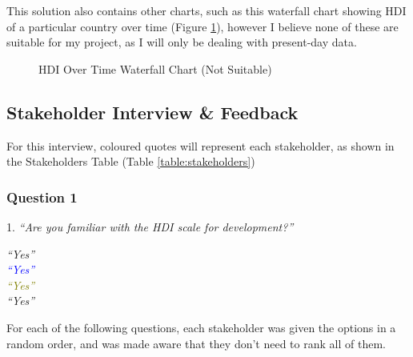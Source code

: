 \documentclass[12pt]{report}
\begin{document}
This solution also contains other charts, such as this waterfall chart showing HDI of a particular country over time (Figure \ref{fig:es3c}), however I believe none of these are suitable for my project, as I will only be dealing with present-day data.
\begin{figure}[H]
\centering
{}
\caption{HDI Over Time Waterfall Chart (Not Suitable)}\label{fig:es3c}
\end{figure}

\subsection{Stakeholder Interview \& Feedback}\label{sec:stakeholderinterview}
For this interview, coloured quotes will represent each stakeholder, as shown in the Stakeholders Table (Table \ref{table:stakeholders})

\subsubsection{Question 1}
1. \textit{``Are you familiar with the HDI scale for development?''}
\begin{flushright}
\textit{\textcolor{Sepia}{``Yes''}} \\
\textit{\textcolor{Blue}{``Yes''}} \\
\textit{\textcolor{olive}{``Yes''}} \\
\textit{\textcolor{OliveGreen}{``Yes''}}
\end{flushright}
For each of the following questions, each stakeholder was given the options in a random order, and was made aware that they don't need to rank all of them.
\end{document}
